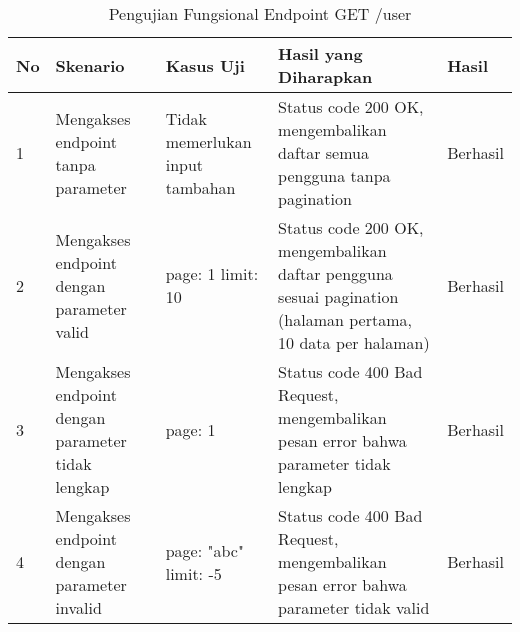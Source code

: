 \begin{table}[H]
    \centering
    \begin{tabular}{|p{0.5cm}|p{3cm}|p{5cm}|p{5cm}|p{1.5cm}|}
        \hline
        \rowcolor[HTML]{DAE8FC} 
        \textbf{No} & \textbf{Skenario} & \textbf{Kasus Uji} & \textbf{Hasil yang Diharapkan} & \textbf{Hasil} \\ \hline
        1 & Mengakses endpoint tanpa parameter & 
        Tidak memerlukan input tambahan & 
        Status code 200 OK, mengembalikan daftar semua pengguna tanpa pagination & 
        Berhasil \\ \hline
        2 & Mengakses endpoint dengan parameter valid & 
        page: 1 \newline limit: 10 & 
        Status code 200 OK, mengembalikan daftar pengguna sesuai pagination (halaman pertama, 10 data per halaman) & 
        Berhasil \\ \hline
        3 & Mengakses endpoint dengan parameter tidak lengkap & 
        page: 1 & 
        Status code 400 Bad Request, mengembalikan pesan error bahwa parameter tidak lengkap & 
        Berhasil \\ \hline
        4 & Mengakses endpoint dengan parameter invalid & 
        page: "abc" \newline limit: -5 & 
        Status code 400 Bad Request, mengembalikan pesan error bahwa parameter tidak valid & 
        Berhasil \\ \hline
    \end{tabular}
    \caption{Pengujian Fungsional Endpoint GET /user}
    \label{tab:user_getall_testing}
\end{table}
